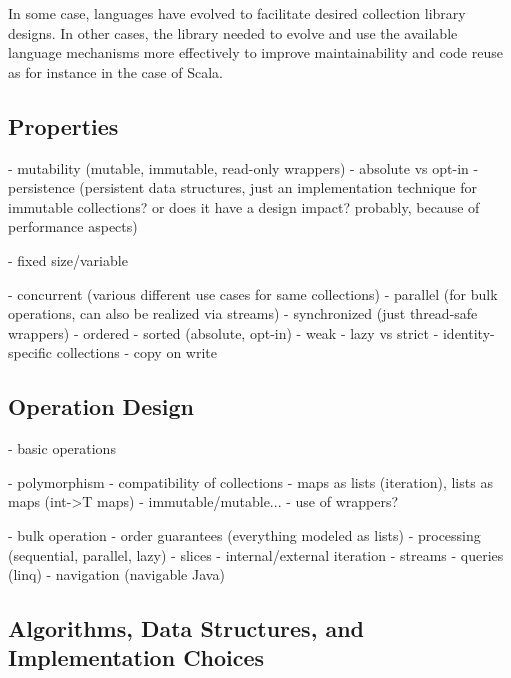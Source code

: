\documentclass[sigconf, 10pt]{acmart}
\begin{document}
In some case, languages have evolved to facilitate
desired collection library designs\citep{Chakravarty:2005:ATC,Garcia:2007}.
In other cases,
the library needed to evolve
and use the available language mechanisms more effectively
to improve maintainability and code reuse
as for instance in the case of Scala\citep{Odersky:2009}.



\subsection{Properties}
\label{sec:col-properties}

\begin{note}
  - mutability (mutable, immutable, read-only wrappers)
   - absolute vs opt-in  
  - persistence (persistent data structures, just an implementation technique for immutable collections? or does it have a design impact? probably, because of performance aspects)

  - fixed size/variable
  
  - concurrent (various different use cases for same collections)
  - parallel (for bulk operations, can also be realized via streams)
  - synchronized (just thread-safe wrappers)
  - ordered
  - sorted (absolute, opt-in)
  - weak
  - lazy vs strict
  - identity-specific collections
  - copy on write
  


\end{note}

\subsection{Operation Design}

\begin{note}
  - basic operations
  
  - polymorphism 
    - compatibility of collections
      - maps as lists (iteration), lists as maps (int->T maps)
      - immutable/mutable...
      - use of wrappers?
  
  
  - bulk operation
    - order guarantees (everything modeled as lists)
    - processing (sequential, parallel, lazy)
    - slices
    - internal/external iteration
      - streams
      - queries (linq)
      - navigation (navigable Java)
      
\end{note}

\subsection{Algorithms, Data Structures, and Implementation Choices}
\label{sec:impl-choices}
\end{document}
